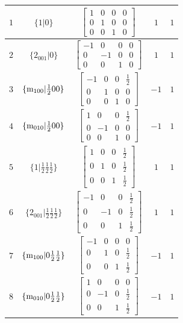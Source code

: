 \documentclass[fleqn,8pt]{jsarticle}
\begin{document}
\begin{longtable}{ccccc}
$ 1 $ & $ \{1|0\} $ & $ \begin{bmatrix} 1 & 0 & 0 & 0 \\ 0 & 1 & 0 & 0 \\ 0 & 0 & 1 & 0 \end{bmatrix} $ & $ 1 $ & $ 1 $ \\ \hline
$ 2 $ & $ \{2{}_{001}|0\} $ & $ \begin{bmatrix} -1 & 0 & 0 & 0 \\ 0 & -1 & 0 & 0 \\ 0 & 0 & 1 & 0 \end{bmatrix} $ & $ 1 $ & $ 1 $ \\ \hline
$ 3 $ & $ \{{\rm m}_{100}|\frac{1}{2} 0 0\} $ & $ \begin{bmatrix} -1 & 0 & 0 & \frac{1}{2} \\ 0 & 1 & 0 & 0 \\ 0 & 0 & 1 & 0 \end{bmatrix} $ & $ -1 $ & $ 1 $ \\ \hline
$ 4 $ & $ \{{\rm m}_{010}|\frac{1}{2} 0 0\} $ & $ \begin{bmatrix} 1 & 0 & 0 & \frac{1}{2} \\ 0 & -1 & 0 & 0 \\ 0 & 0 & 1 & 0 \end{bmatrix} $ & $ -1 $ & $ 1 $ \\ \hline
$ 5 $ & $ \{1|\frac{1}{2} \frac{1}{2} \frac{1}{2}\} $ & $ \begin{bmatrix} 1 & 0 & 0 & \frac{1}{2} \\ 0 & 1 & 0 & \frac{1}{2} \\ 0 & 0 & 1 & \frac{1}{2} \end{bmatrix} $ & $ 1 $ & $ 1 $ \\ \hline
$ 6 $ & $ \{2{}_{001}|\frac{1}{2} \frac{1}{2} \frac{1}{2}\} $ & $ \begin{bmatrix} -1 & 0 & 0 & \frac{1}{2} \\ 0 & -1 & 0 & \frac{1}{2} \\ 0 & 0 & 1 & \frac{1}{2} \end{bmatrix} $ & $ 1 $ & $ 1 $ \\ \hline
$ 7 $ & $ \{{\rm m}_{100}|0 \frac{1}{2} \frac{1}{2}\} $ & $ \begin{bmatrix} -1 & 0 & 0 & 0 \\ 0 & 1 & 0 & \frac{1}{2} \\ 0 & 0 & 1 & \frac{1}{2} \end{bmatrix} $ & $ -1 $ & $ 1 $ \\ \hline
$ 8 $ & $ \{{\rm m}_{010}|0 \frac{1}{2} \frac{1}{2}\} $ & $ \begin{bmatrix} 1 & 0 & 0 & 0 \\ 0 & -1 & 0 & \frac{1}{2} \\ 0 & 0 & 1 & \frac{1}{2} \end{bmatrix} $ & $ -1 $ & $ 1 $ \\ \hline

\end{longtable}
\end{document}
